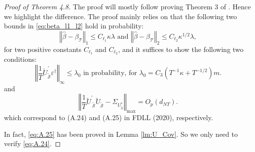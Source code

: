 ﻿\documentclass[12pt]{article}
\newcommand{\0}{\mbox{\bf 0}}
\theoremstyle{plain}%
\theoremstyle{definition}
\begin{document}
{\begin{proof}[Proof of Theorem 4.8]
The proof will mostly follow proving Theorem 3 of \citet*[FDLL]{FanDemirkayaLiLv2020}. Hence we
highlight the difference. The proof mainly relies on that the following two
bounds in \eqref{eq:beta_l1_l2} hold in probability: 
\begin{equation}  \label{eq:beta_l1_l2}
\left\Vert \widehat{\beta }-\beta _{\mathcal{T}}\right\Vert _{1}\leq
C_{\ell_{1}}\kappa \lambda \text{ and }\left\Vert \widehat{\beta }-\beta _{ 
\mathcal{T}}\right\Vert _{2}\leq C_{\ell_{2}}\kappa ^{1/2}\lambda,
\end{equation}
for two positive constants $C_{\ell_{1}}$ and $C_{\ell_{2}}$, and it
suffices to show the following two conditions: 
\begin{equation}  \label{eq:A.24}
\left\Vert \frac{1}{T}\breve{U}_{{\widetilde{\mathcal{S}}}}^{\prime
}\varepsilon ^{\dagger }\right\Vert _{\infty }\leq \lambda _{0}\text{ in
probability, for }\lambda _{0}=C_{3}\left( T^{-1}\kappa +T^{-1/2}\right) m.
\end{equation}
and 
\begin{equation}  \label{eq:A.25}
\left\Vert \frac{1}{T}\breve{U}_{{\ \widetilde{\mathcal{S}}}}^{\prime } 
\breve{U}_{{\widetilde{\mathcal{S}}}}-\Sigma _{U_{{\widetilde{\mathcal{S}}}
}^{\ast }}\right\Vert _{\max }=O_{p}\left( d_{NT}\right) .
\end{equation}
which correspond to (A.24) and (A.25) in FDLL (2020), respectively.

In fact, \eqref{eq:A.25} has been proved in Lemma \ref{lm:U_Cov}. So we only
need to verify \eqref{eq:A.24}.


\end{proof}}
\end{document}
